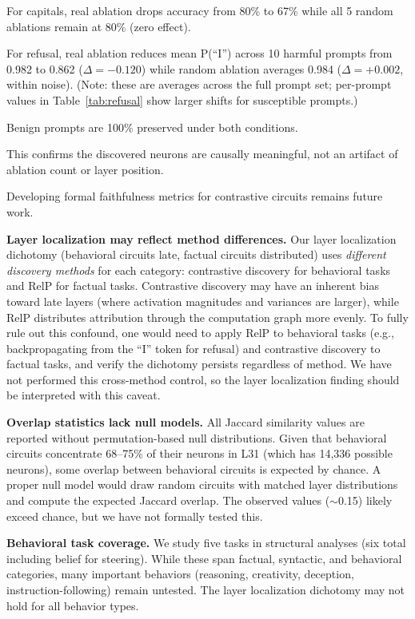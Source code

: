 \documentclass[11pt]{article}
\begin{document}
For capitals, real ablation drops accuracy from 80\% to 67\% while all 5 random ablations remain at 80\% (zero effect).

For refusal, real ablation reduces mean P(``I'') across 10 harmful prompts from 0.982 to 0.862 ($\Delta = -0.120$) while random ablation averages 0.984 ($\Delta = +0.002$, within noise).
(Note: these are averages across the full prompt set; per-prompt values in Table~\ref{tab:refusal} show larger shifts for susceptible prompts.)

Benign prompts are 100\% preserved under both conditions.

This confirms the discovered neurons are causally meaningful, not an artifact of ablation count or layer position.

Developing formal faithfulness metrics for contrastive circuits remains future work.

\textbf{Layer localization may reflect method differences.}
Our layer localization dichotomy (behavioral circuits late, factual circuits distributed) uses \emph{different discovery methods} for each category: contrastive discovery for behavioral tasks and RelP for factual tasks.
Contrastive discovery may have an inherent bias toward late layers (where activation magnitudes and variances are larger), while RelP distributes attribution through the computation graph more evenly.
To fully rule out this confound, one would need to apply RelP to behavioral tasks (e.g., backpropagating from the ``I'' token for refusal) and contrastive discovery to factual tasks, and verify the dichotomy persists regardless of method.
We have not performed this cross-method control, so the layer localization finding should be interpreted with this caveat.

\textbf{Overlap statistics lack null models.}
All Jaccard similarity values are reported without permutation-based null distributions.
Given that behavioral circuits concentrate 68--75\% of their neurons in L31 (which has 14,336 possible neurons), some overlap between behavioral circuits is expected by chance.
A proper null model would draw random circuits with matched layer distributions and compute the expected Jaccard overlap.
The observed values (${\sim}$0.15) likely exceed chance, but we have not formally tested this.

\textbf{Behavioral task coverage.}
We study five tasks in structural analyses (six total including belief for steering). While these span factual, syntactic, and behavioral categories, many important behaviors (reasoning, creativity, deception, instruction-following) remain untested.
The layer localization dichotomy may not hold for all behavior types.
\end{document}
